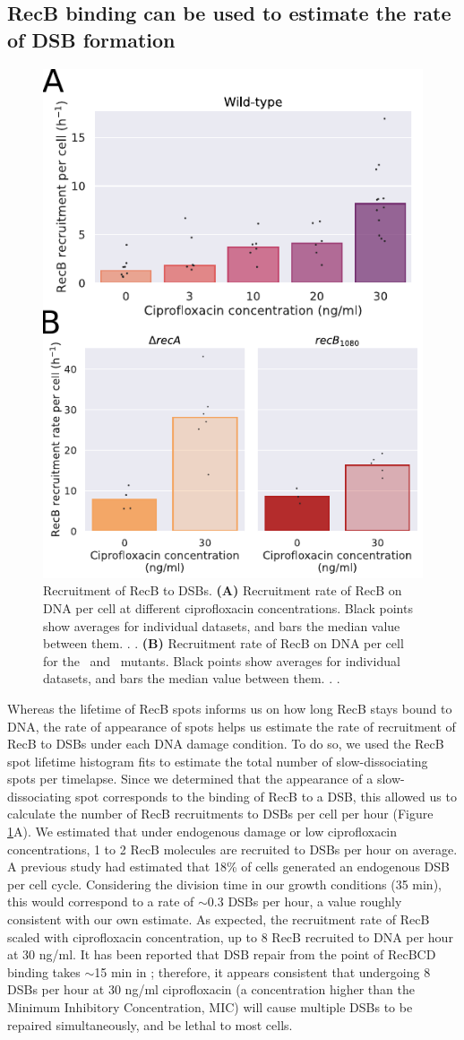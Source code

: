 \subsection*{RecB binding can be used to estimate the rate of DSB formation}

\begin{figure}[htbp]
    \centering
    \includegraphics[width=.4\textwidth]{Figures/Fig3_RecB_recruitment.pdf}
    \caption{Recruitment of RecB to DSBs. \textbf{(A)} Recruitment rate of RecB on DNA per cell at different ciprofloxacin concentrations. Black points show averages for individual datasets, and bars the median value between them. . . \textbf{(B)} Recruitment rate of RecB on DNA per cell for the \dreca\ and \geneteneighty\ mutants. Black points show averages for individual datasets, and bars the median value between them. . .}
    \label{Fig:recruitment}
\end{figure}

Whereas the lifetime of RecB spots informs us on how long RecB stays bound to DNA, the rate of appearance of spots helps us estimate the rate of recruitment of RecB to DSBs under each DNA damage condition. To do so, we used the RecB spot lifetime histogram fits to estimate the total number of slow-dissociating spots per timelapse. Since we determined that the appearance of a slow-dissociating spot corresponds to the binding of RecB to a DSB, this allowed us to calculate the number of RecB recruitments to DSBs per cell per hour (Figure \ref{Fig:recruitment}A). We estimated that under endogenous damage or low ciprofloxacin concentrations, 1 to 2 RecB molecules are recruited to DSBs per hour on average. A previous study had estimated that 18\% of cells generated an endogenous DSB per cell cycle\cite{Sinha2018}. Considering the division time in our growth conditions (35 min), this would correspond to a rate of $\sim$0.3 DSBs per hour, a value roughly consistent with our own estimate. As expected, the recruitment rate of RecB scaled with ciprofloxacin concentration, up to 8 RecB recruited to DNA per hour at 30 ng/ml. It has been reported that DSB repair from the point of RecBCD binding takes $\sim$15 min in \ecoli\cite{Wiktor2021}; therefore, it appears consistent that undergoing 8 DSBs per hour at 30 ng/ml ciprofloxacin (a concentration higher than the Minimum Inhibitory Concentration, MIC) will cause multiple DSBs to be repaired simultaneously, and be lethal to most cells.

